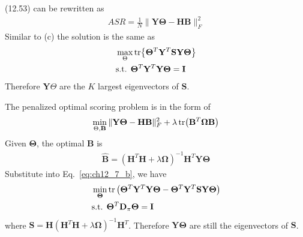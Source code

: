 \begin{exercise}
  \begin{exerciseSection}
    (12.53) can be rewritten as
    \begin{align}
      ASR = \frac{1}{N}\|\mathbf{Y\Theta}-\mathbf{HB}\|_F^2
    \end{align}
    Similar to (c) the solution is the same as
    \begin{align}
      \label{eq:ch_12_6_os}
      & \max_{\Theta}\tr{\mathbf{\Theta}^T\mathbf{Y}^T\mathbf{SY\Theta}} \\
      & \mbox{s.t. } \mathbf{\Theta}^T\mathbf{Y}^T\mathbf{Y\Theta} = \mathbf{I}
    \end{align}
    Therefore $\mathbf{Y}\Theta$ are the $K$ largest eigenvectors of
    $\mathbf{S}$.
  \end{exerciseSection}
\end{exercise}

\begin{exercise}
  The penalized optimal scoring problem is in the form of
  \begin{align}
    \min_{\Theta, \mathbf{B}}\|\mathbf{Y\Theta}-\mathbf{HB}\|_F^2 +
    \lambda\tr(\mathbf{B}^T\mathbf{\Omega B})
    \label{eq:ch12_7_b}
  \end{align}
  Given $\mathbf{\Theta}$, the optimal $\mathbf{B}$ is
  \begin{align}
    \hat{\mathbf{B}} =
    (\mathbf{H}^T\mathbf{H}+\lambda\mathbf{\Omega})^{-1}
    \mathbf{H}^T\mathbf{Y\Theta}
  \end{align}
  Substitute into Eq.~\eqref{eq:ch12_7_b}, we have
  \begin{align}
    & \min_{\mathbf{\Theta}}
    \tr\left(\mathbf{\Theta}^T\mathbf{Y}^T\mathbf{Y\Theta} -
    \mathbf{\Theta}^T\mathbf{Y}^T\mathbf{S}\mathbf{Y\Theta}\right) \\
    & \mbox{s.t. }
    \mathbf{\Theta}^T\mathbf{D}_{\pi}\mathbf{\Theta} = \mathbf{I}
  \end{align}
  where $\mathbf{S} = \mathbf{H}(\mathbf{H}^T\mathbf{H}+\lambda \mathbf{\Omega
  })^{-1}\mathbf{H}^T$. Therefore $\mathbf{Y\Theta}$ are still the eigenvectors
  of $\mathbf{S}$.
\end{exercise}

